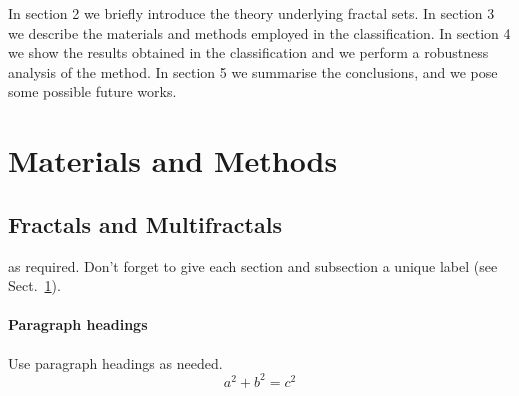 In section 2 we briefly introduce the theory underlying fractal sets. In section 3 we describe the materials and methods employed in the classification. In section 4 we show the results obtained in the classification and we perform a robustness analysis of the method. In section 5 we summarise the conclusions, and we pose some possible future works.



\section{Materials and Methods}
\label{sec:1}
\subsection{Fractals and Multifractals}
\label{sec:2}
as required. Don't forget to give each section
and subsection a unique label (see Sect.~\ref{sec:1}).
\paragraph{Paragraph headings} Use paragraph headings as needed.
\begin{equation}
a^2+b^2=c^2
\end{equation}

%
%

